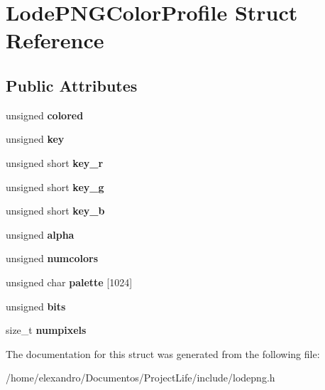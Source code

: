\section{Lode\+P\+N\+G\+Color\+Profile Struct Reference}
\label{struct_lode_p_n_g_color_profile}
\subsection*{Public Attributes}
\begin{DoxyCompactItemize}
\item 
\mbox{\label{struct_lode_p_n_g_color_profile_abf063a566a4ab9f4d71b49764573d610}} 
unsigned {\bfseries colored}
\item 
\mbox{\label{struct_lode_p_n_g_color_profile_a24f19f400a53672340877eefbc837b0c}} 
unsigned {\bfseries key}
\item 
\mbox{\label{struct_lode_p_n_g_color_profile_a0398985ae0572ef97e83c33c7486cafd}} 
unsigned short {\bfseries key\+\_\+r}
\item 
\mbox{\label{struct_lode_p_n_g_color_profile_aba03e973374bd15315b8c01b86e94e8f}} 
unsigned short {\bfseries key\+\_\+g}
\item 
\mbox{\label{struct_lode_p_n_g_color_profile_a39b65ec69f6aaee3ee7312a993f21e40}} 
unsigned short {\bfseries key\+\_\+b}
\item 
\mbox{\label{struct_lode_p_n_g_color_profile_a554fea329af8034e91e1cdd8c1af0d90}} 
unsigned {\bfseries alpha}
\item 
\mbox{\label{struct_lode_p_n_g_color_profile_afdce0f5fbec46d6b8f1ec63da0a285f9}} 
unsigned {\bfseries numcolors}
\item 
\mbox{\label{struct_lode_p_n_g_color_profile_a223f8bee4c9ae8be0b70cc08f19aaead}} 
unsigned char {\bfseries palette} [1024]
\item 
\mbox{\label{struct_lode_p_n_g_color_profile_a1d3870b03dfe6d699bf4c968c9bc1890}} 
unsigned {\bfseries bits}
\item 
\mbox{\label{struct_lode_p_n_g_color_profile_a12de3184a6f953e34e2b8551b806f556}} 
size\+\_\+t {\bfseries numpixels}
\end{DoxyCompactItemize}


The documentation for this struct was generated from the following file\+:\begin{DoxyCompactItemize}
\item 
/home/elexandro/\+Documentos/\+Project\+Life/include/lodepng.\+h\end{DoxyCompactItemize}
